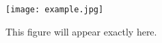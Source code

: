 \begin{figure}[H]
    \centering
    \texttt{[image: example.jpg]}
    \caption{This figure will appear exactly here.}
    \label{fig:example}
\end{figure}
